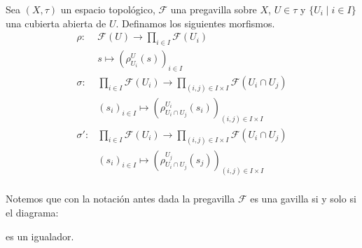 \documentclass[14pt]{extarticle}
\begin{document}
\begin{definicion}{}{}
    Sea $(X,\tau)$ un espacio topológico,
    $\mathcal{F}$ una pregavilla sobre $X$,
    $U\in\tau$ y $\{U_i\mid i\in I\}$ una 
    cubierta abierta de $U$.
    Definamos los siguientes morfismos.
    \begin{align*}%
        \rho:&\mathcal{F}(U)\rightarrow \prod_{i\in I}\mathcal{F}(U_i)\\
        &s \mapsto \left(\rho_{U_i}^{U}(s)\right)_{i\in I}\\
        \sigma:&\prod_{i\in I}\mathcal{F}(U_i)\rightarrow \prod_{(i,j)\in I\times I}\mathcal{F}(U_i\cap U_j)\\
        &(s_i)_{i\in I} \mapsto \left(\rho_{U_i\cap U_j}^{U_i}(s_i)\right)_{(i,j)\in I \times I}\\
        \sigma':&\prod_{i\in I}\mathcal{F}(U_i)\rightarrow \prod_{(i,j)\in I\times I}\mathcal{F}(U_i\cap U_j)\\
        &(s_i)_{i\in I} \mapsto \left(\rho_{U_i\cap U_j}^{U_j}(s_j)\right)_{(i,j)\in I \times I}\\
    \end{align*}%
\end{definicion}
\begin{observacion}{}{}
    Notemos que con la notación antes dada 
    la pregavilla $\mathcal{F}$ es una gavilla
    si y solo si el diagrama:
    es un igualador.
\end{observacion}
\end{document}

